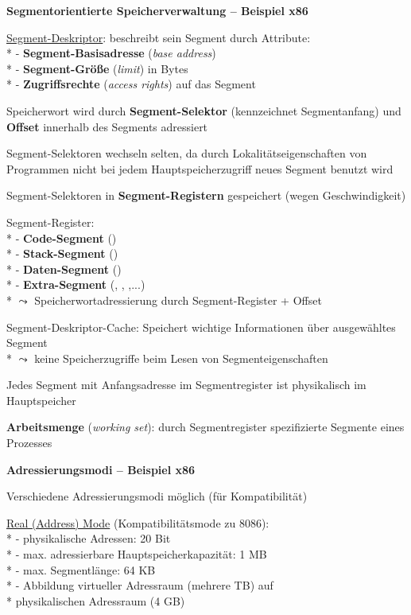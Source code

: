 \textbf{Segmentorientierte Speicherverwaltung -- Beispiel x86}
\begin{items}
  \item \underline{Segment-Deskriptor}: beschreibt sein Segment durch Attribute: \\*
    - \textbf{Segment-Basisadresse} (\emph{base address}) \\*
    - \textbf{Segment-Größe} (\emph{limit}) in Bytes \\*
    - \textbf{Zugriffsrechte} (\emph{access rights}) auf das Segment
  \item Speicherwort wird durch \textbf{Segment-Selektor} (kennzeichnet Segmentanfang) und \textbf{Offset} innerhalb des Segments adressiert
  \item Segment-Selektoren wechseln selten, da durch Lokalitätseigenschaften von Programmen nicht bei jedem Hauptspeicherzugriff neues Segment benutzt wird
  \item Segment-Selektoren in \textbf{Segment-Registern} gespeichert (wegen Geschwindigkeit)
  \item Segment-Register: \\*
    - \textbf{Code-Segment} () \\*
    - \textbf{Stack-Segment} () \\*
    - \textbf{Daten-Segment} () \\*
    - \textbf{Extra-Segment} (, , ,...) \\*
    \( \leadsto \) Speicherwortadressierung durch Segment-Register + Offset
  \item Segment-Deskriptor-Cache: Speichert wichtige Informationen über ausgewähltes Segment \\*
    \( \leadsto \) keine Speicherzugriffe beim Lesen von Segmenteigenschaften
  \item Jedes Segment mit Anfangsadresse im Segmentregister ist physikalisch im Hauptspeicher
  \item \textbf{Arbeitsmenge} (\emph{working set}): durch Segmentregister spezifizierte Segmente eines Prozesses
\end{items}

\textbf{Adressierungsmodi -- Beispiel x86}
\begin{items}
  \item Verschiedene Adressierungsmodi möglich (für Kompatibilität)
  \item \underline{Real (Address) Mode} (Kompatibilitätsmode zu 8086): \\*
    - physikalische Adressen: 20 Bit \\*
    - max. adressierbare Hauptspeicherkapazität: 1 MB \\*
    - max. Segmentlänge: 64 KB \\*
    - Abbildung virtueller Adressraum (mehrere TB) auf \\* \phantom{-} physikalischen Adressraum (4 GB)
\end{items}